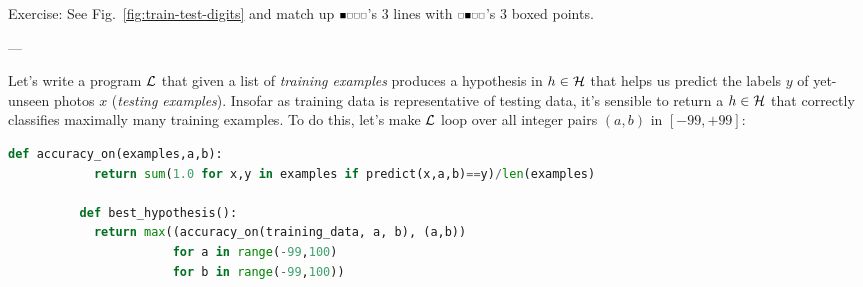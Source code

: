 \documentclass[11pt, justified]{tufte-book}
\newcommand{\offourline}[1]{
    {\tiny \raisebox{0.04cm}{\scalebox{0.9}{$\substack{
        \IfSubStr{#1}{0}{{\blacksquare}}{\square}   
        \IfSubStr{#1}{1}{{\blacksquare}}{\square}
        \IfSubStr{#1}{2}{{\blacksquare}}{\square}   
        \IfSubStr{#1}{3}{{\blacksquare}}{\square}   
    }$}}}%
}
\newcommand{\attn}[1]{{\bro \textsf{#1}}}
\newcommand{\sampassage}[1]{
   \vspace{0.1cm}
   \par\noindent{\hspace{-2cm}\normalsize \sc \gre #1} ---
}
\theoremstyle{definition}
\begin{document}
        \noindent
        \attn{Exercise:} {See Fig.\ \ref{fig:train-test-digits} and match up $\offourline{0}$'s $3$ lines with
        $\offourline{1}$'s $3$ boxed points.}


      \sampassage{optimization}
        Let's write a program $\mathcal{L}$ that given a list of \emph{training
        examples} produces a hypothesis in $h \in \mathcal{H}$ that helps us predict
        the labels $y$ of yet-unseen photos $x$ (\emph{testing examples}).
        Insofar as training data is representative of testing data, it's
        sensible to return a $h\in \mathcal{H}$ that correctly classifies maximally
        many training examples.
        To do this, let's make $\mathcal{L}$ loop over all integer pairs $(a,b)$ in
        $[-99,+99]$:  %
        \begin{lstlisting}[language=Python, basicstyle=\footnotesize\ttfamily]
          def accuracy_on(examples,a,b):
            return sum(1.0 for x,y in examples if predict(x,a,b)==y)/len(examples)

          def best_hypothesis():
            return max((accuracy_on(training_data, a, b), (a,b))
                       for a in range(-99,100) 
                       for b in range(-99,100))
        \end{lstlisting}
\end{document}
